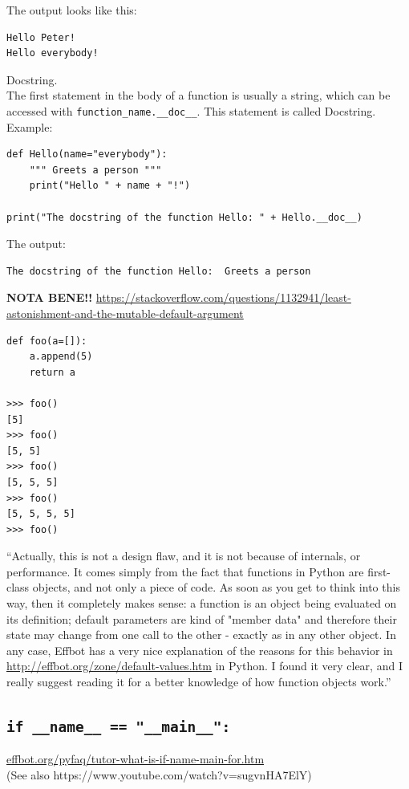 \documentclass[11pt,a4paper]{article}
\begin{document}
\noindent
The output looks like this:

\begin{lstlisting}
Hello Peter!
Hello everybody!
\end{lstlisting}

\noindent
Docstring.\\
The first statement in the body of a function is usually a string, which can be accessed with {\tt function\_name.\_\_doc\_\_}. This statement is called Docstring. Example:

\begin{lstlisting}
def Hello(name="everybody"):
    """ Greets a person """
    print("Hello " + name + "!")

print("The docstring of the function Hello: " + Hello.__doc__)
\end{lstlisting}

\noindent 
The output:
\begin{lstlisting}
The docstring of the function Hello:  Greets a person 
\end{lstlisting}


\noindent
{\bf NOTA BENE!!}
\href{https://stackoverflow.com/questions/1132941/least-astonishment-and-the-mutable-default-argument}{https://stackoverflow.com/questions/1132941/least-astonishment-and-the-mutable-default-argument}\\
\begin{lstlisting}
def foo(a=[]):
    a.append(5)
    return a

>>> foo()
[5]
>>> foo()
[5, 5]
>>> foo()
[5, 5, 5]
>>> foo()
[5, 5, 5, 5]
>>> foo()
\end{lstlisting}
``Actually, this is not a design flaw, and it is not because of
internals, or performance.  It comes simply from the fact that
functions in Python are first-class objects, and not only a piece of
code.  As soon as you get to think into this way, then it completely
makes sense: a function is an object being evaluated on its
definition; default parameters are kind of "member data" and therefore
their state may change from one call to the other - exactly as in any
other object.  In any case, Effbot has a very nice explanation of the
reasons for this behavior in \href{Default Parameter
Values}{http://effbot.org/zone/default-values.htm} in Python.  I found
it very clear, and I really suggest reading it for a better knowledge
of how function objects work.''


\subsection{{\tt if \_\_name\_\_ == "\_\_main\_\_":}}
\href{http://effbot.org/pyfaq/tutor-what-is-if-name-main-for.htm}{effbot.org/pyfaq/tutor-what-is-if-name-main-for.htm}\\
(See also https://www.youtube.com/watch?v=sugvnHA7ElY)\\
\end{document}
